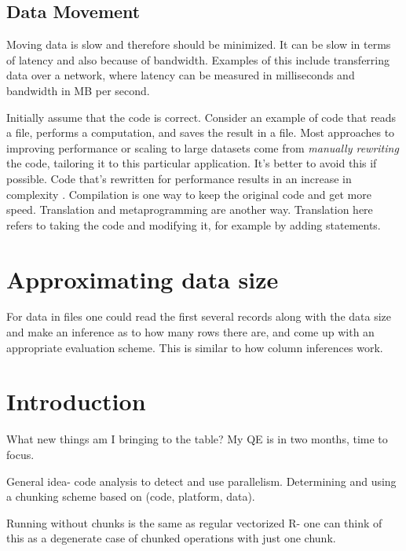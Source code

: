 \documentclass[12pt]{article}
\begin{document}
\subsection{Data Movement}

Moving data is slow and therefore should be minimized. It can be slow in
terms of latency and also because of bandwidth. Examples of this include
transferring data over a network, where latency can be measured in
milliseconds and bandwidth in MB per second.

Initially assume that the code is correct. Consider an example of code that
reads a file, performs a computation, and saves the result in a file.
Most approaches to improving performance or scaling to large datasets
come from \emph{manually rewriting} the code, tailoring it to this
particular application. It's better to avoid this if possible.  Code that's
rewritten for performance results in an increase in complexity
\cite{matloff2015parallel}.  Compilation is one way to keep the original
code and get more speed. Translation and metaprogramming are another way.
Translation here refers to taking the code and modifying it, for example by
adding statements.


\section{Approximating data size}

For data in files one could read the first several records along with the
data size and make an inference as to how many rows there are, and come up
with an appropriate evaluation scheme. This is similar to how column
inferences work.

\section{Introduction}

What new things am I bringing to the table? My QE is in two months, time to
focus.

General idea- code analysis to detect and use parallelism. Determining and
using a chunking scheme based on (code, platform, data).

Running without chunks is the same as regular vectorized R- one can think
of this as a degenerate case of chunked operations with just one chunk.
\end{document}
